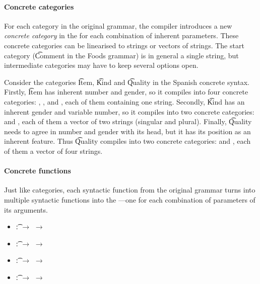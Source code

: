 \paragraph{Concrete categories}

For each category in the original grammar, the \gf{} compiler
introduces a new \emph{concrete category} in the \pmcfg{} for each combination of
inherent parameters.  
These concrete categories can be linearised to strings or vectors of
strings. The start category (\t{Comment} in the Foods grammar) is in
general a single string, but intermediate categories may have to keep
several options open. 

Consider the categories \t{Item}, \t{Kind} and \t{Quality} in the
Spanish concrete syntax. Firstly, \t{Item} has inherent number
and gender, so it compiles into four concrete categories:
, ,  and
, each of them containing one string. Secondly,
\t{Kind} has an inherent gender and variable number, so it compiles into
two concrete categories:  and , each of them a
vector of two strings (singular and plural). Finally, \t{Quality} needs to
agree in number and gender with its head, but it has its position as
an inherent feature.  Thus \t{Quality} compiles into two concrete
categories:  and , each of them a vector of
four strings.

\paragraph{Concrete functions}
Just like categories, each syntactic function from the original
grammar turns into multiple syntactic functions into the
\pmcfg{}---one for each combination of parameters of its arguments.

\begin{itemize}
\setlength\itemsep{0em}
\item {} \t{:}  $\rightarrow$  $\rightarrow$ 
\item  {} \t{:}  $\rightarrow$  $\rightarrow$ 
\item  {}\t{:}  $\rightarrow$  $\rightarrow$ 
\item {} \t{:}  $\rightarrow$  $\rightarrow$ 
\end{itemize}


